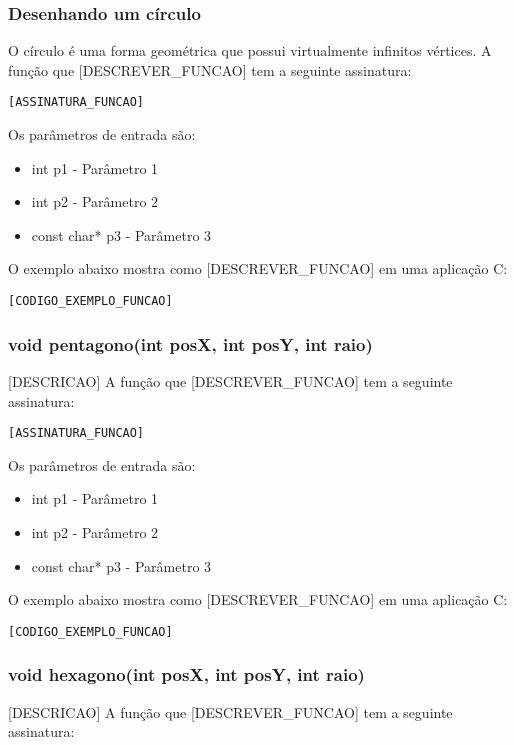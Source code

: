 \documentclass[12pt, %
openright,
oneside, %
a4paper,    %
brazil]{facom-ufu-abntex2}
\begin{document}
\subsubsection{Desenhando um círculo}
O círculo é uma forma geométrica que possui virtualmente infinitos vértices.
A função que [DESCREVER_FUNCAO] tem a seguinte assinatura:

\begin{lstlisting}
[ASSINATURA_FUNCAO]
\end{lstlisting}

Os parâmetros de entrada são:

\begin{itemize}
    \item int p1 - Parâmetro 1
    \item int p2 - Parâmetro 2
    \item const char* p3 - Parâmetro 3
\end{itemize}

O exemplo abaixo mostra como [DESCREVER_FUNCAO] em uma aplicação C:

\begin{lstlisting}
[CODIGO_EXEMPLO_FUNCAO]
\end{lstlisting}

\subsubsection{void pentagono(int posX, int posY, int raio)}
[DESCRICAO]
A função que [DESCREVER_FUNCAO] tem a seguinte assinatura:

\begin{lstlisting}
[ASSINATURA_FUNCAO]
\end{lstlisting}

Os parâmetros de entrada são:

\begin{itemize}
    \item int p1 - Parâmetro 1
    \item int p2 - Parâmetro 2
    \item const char* p3 - Parâmetro 3
\end{itemize}

O exemplo abaixo mostra como [DESCREVER_FUNCAO] em uma aplicação C:

\begin{lstlisting}
[CODIGO_EXEMPLO_FUNCAO]
\end{lstlisting}

\subsubsection{void hexagono(int posX, int posY, int raio)}
[DESCRICAO]
A função que [DESCREVER_FUNCAO] tem a seguinte assinatura:
\end{document}
